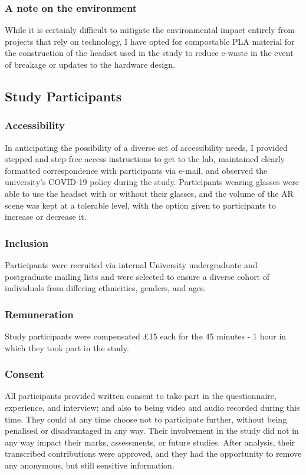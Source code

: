 \subsubsection{A note on the environment}\label{sec: polaris-ethics-environment}
While it is certainly difficult to mitigate the environmental impact entirely from projects that rely on technology, I have opted for compostable PLA material for the construction of the headset used in the study to reduce e-waste in the event of breakage or updates to the hardware design.

\subsection{Study Participants}\label{sec: polaris-ethics-participants}
\subsubsection{Accessibility}\label{sec: polaris-ethics-accessibility}
In anticipating the possibility of a diverse set of accessibility needs, I provided stepped and step-free access instructions to get to the lab, maintained clearly formatted correspondence with participants via e-mail, and observed the university's COVID-19 policy during the study. Participants wearing glasses were able to use the headset with or without their glasses, and the volume of the AR scene was kept at a tolerable level, with the option given to participants to increase or decrease it.

\subsubsection{Inclusion}\label{sec: polaris-ethics-inclusion}
Participants were recruited via internal University undergraduate and postgraduate mailing lists and were selected to ensure a diverse cohort of individuals from differing ethnicities, genders, and ages.

\subsubsection{Remuneration}\label{sec: polaris-ethics-renumeration}
Study participants were compensated £15 each for the 45 minutes - 1 hour in which they took part in the study.

\subsubsection{Consent}\label{sec: polaris-ethics-consent}
All participants provided written consent to take part in the questionnaire, experience, and interview; and also to being video and audio recorded during this time. They could at any time choose not to participate further, without being penalised or disadvantaged in any way. Their involvement in the study did not in any way impact their marks, assessments, or future studies. After analysis, their transcribed contributions were approved, and they had the opportunity to remove any anonymous, but still sensitive information.


